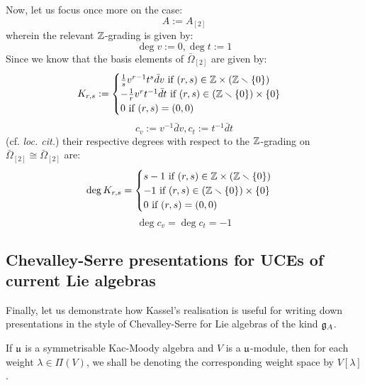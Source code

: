 \begin{remark}
            Now, let us focus once more on the case:
                $$A := A_{[2]}$$
            wherein the relevant $\mathbb{Z}$-grading is given by:
                $$\deg v := 0, \deg t := 1$$
            Since we know that the basis elements of $\bar{\Omega}_{[2]}$ are given by:
                $$
                    K_{r, s} :=
                    \begin{cases}
                        \text{$\frac1s v^{r - 1} t^s \bar{d}v$ if $(r, s) \in \Z \x (\Z \setminus \{0\})$}
                        \\
                        \text{$-\frac1r v^r t^{-1} \bar{d}t$ if $(r, s) \in (\Z \setminus \{0\}) \x \{0\}$}
                        \\
                        \text{$0$ if $(r, s) = (0, 0)$}
                    \end{cases}
                $$
                $$c_v := v^{-1} \bar{d}v, c_t := t^{-1} \bar{d}t$$
            (cf. \textit{loc. cit.}) their respective degrees with respect to the $\mathbb{Z}$-grading on $\bar{\Omega}_{[2]} \cong \bar{\Omega}_{[2]}$ are:
                $$
                    \deg K_{r, s} =
                    \begin{cases}
                        \text{$s - 1$ if $(r, s) \in \Z \x (\Z \setminus \{0\})$}
                        \\
                        \text{$-1$ if $(r, s) \in (\Z \setminus \{0\}) \x \{0\}$}
                        \\
                        \text{$0$ if $(r, s) = (0, 0)$}
                    \end{cases}
                $$
                $$\deg c_v = \deg c_t = -1$$
        \end{remark}

    \subsection{Chevalley-Serre presentations for UCEs of current Lie algebras}
        Finally, let us demonstrate how Kassel's realisation is useful for writing down presentations in the style of Chevalley-Serre for Lie algebras of the kind $\mathfrak{g}_A$.

        \begin{convention}
            If $\mathfrak{u}$ is a symmetrisable Kac-Moody algebra and $V$ is a $\mathfrak{u}$-module, then for each weight $\lambda \in \Pi(V)$, we shall be denoting the corresponding weight space by $V[\lambda]$.
        \end{convention}

